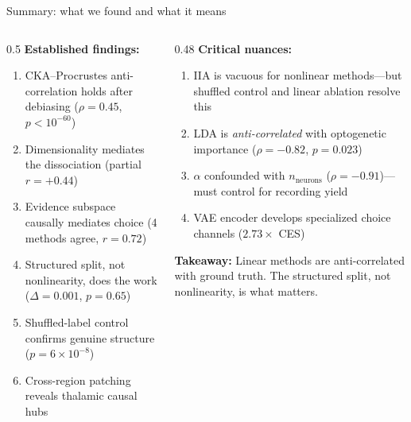 \documentclass[aspectratio=169,11pt]{beamer}
\begin{document}
\begin{frame}{Summary: what we found and what it means}
\begin{columns}[T]
\begin{column}{0.5\textwidth}
{\small \textbf{Established findings:}}
{\small
\begin{enumerate}\setlength\itemsep{1pt}
  \item CKA--Procrustes anti-correlation holds after debiasing ($\rho = 0.45$, $p < 10^{-60}$)
  \item Dimensionality mediates the dissociation (partial $r = +0.44$)
  \item Evidence subspace causally mediates choice (4 methods agree, $r = 0.72$)
  \item Structured split, not nonlinearity, does the work ($\Delta = 0.001$, $p = 0.65$)
  \item Shuffled-label control confirms genuine structure ($p = 6 \times 10^{-8}$)
  \item Cross-region patching reveals thalamic causal hubs
\end{enumerate}
}
\end{column}
\begin{column}{0.48\textwidth}
{\small \textbf{Critical nuances:}}
{\small
\begin{enumerate}\setlength\itemsep{1pt}
  \setcounter{enumi}{6}
  \item \textcolor{fail}{IIA is vacuous for nonlinear methods}---but shuffled control and linear ablation resolve this
  \item LDA is \emph{anti-correlated} with optogenetic importance ($\rho = -0.82$, $p = 0.023$)
  \item $\alpha$ confounded with $n_{\text{neurons}}$ ($\rho = -0.91$)---must control for recording yield
  \item VAE encoder develops specialized choice channels ($2.73\times$ CES)
\end{enumerate}
}

\vspace{0.3em}
{\small \textbf{Takeaway:} Linear methods are anti-correlated with ground truth. The structured split, not nonlinearity, is what matters.}
\end{column}
\end{columns}
\end{frame}
\end{document}

